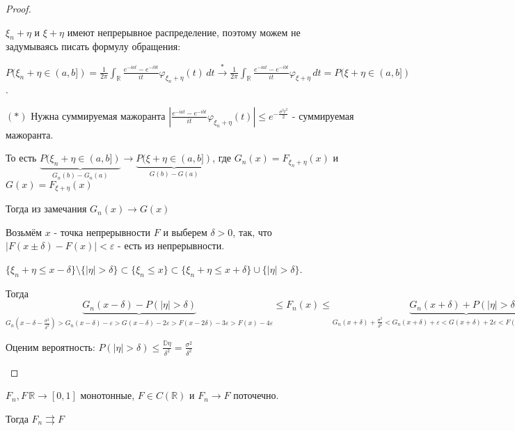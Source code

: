 \begin{proof}
\begin{enumerate}
{            $\xi_n + \eta$ и $\xi + \eta$ имеют непрерывное распределение, поэтому можем не задумываясь писать формулу обращения:

            $P(\xi_n + \eta \in (a, b]) = \frac{1}{2\pi} \int_{\mathbb{R}} \frac{e^{-iat} - e^{-ibt}}{it} \varphi_{\xi_n + \eta} (t) \, dt \overset{*}{\rightarrow} \frac{1}{2\pi} \int_{\mathbb{R}} \frac{e^{-iat} - e^{-ibt}}{it} \varphi_{\xi + \eta} \, dt = P(\xi + \eta \in (a, b])$.

            $(*)$ Нужна суммируемая мажоранта $\left | \frac{e^{-iat} - e^{-ibt}}{it} \varphi_{\xi_n + \eta} (t) \right | \leqslant e^{-\frac{\sigma^2t^2}{2}}$ - суммируемая мажоранта.

            То есть $\underbrace{P(\xi_n + \eta \in (a, b])}_{G_n (b) - G_n(a)} \rightarrow \underbrace{P(\xi + \eta \in (a, b])}_{G(b) - G(a)}$, где $G_n (x) = F_{\xi_n + \eta}(x)$ и $G(x) = F_{\xi + \eta} (x)$

            Тогда из замечания $G_n(x) \rightarrow G(x)$

            Возьмём $x$ - точка непрерывности $F$ и выберем $\delta > 0$, так, что $|F(x \pm \delta) - F(x)| < \varepsilon$ - есть из непрерывности.

            $ \{ \xi_n + \eta \leqslant x - \delta \} \setminus \{ |\eta| > \delta \} \subset  \{ \xi_n \leqslant x \} \subset \{ \xi_n + \eta \leqslant x + \delta \} \cup \{ |\eta| > \delta \}$.

            Тогда $\underbrace{G_{n} (x - \delta) - P(|\eta| > \delta)}_{G_n (x - \delta - \frac{\sigma^2}{\delta^2}) > G_n (x - \delta) - \varepsilon > G(x - \delta) - 2\varepsilon > F(x - 2\delta) - 3\varepsilon > F(x) - 4\varepsilon} \leqslant F_n (x) \leqslant
            \underbrace{G_{n} (x + \delta) + P(|\eta| > \delta)}_{G_n (x + \delta) + \frac{\sigma^2}{\delta^2} < G_n (x + \delta) + \varepsilon < G(x + \delta) + 2\varepsilon < F(x + 2\delta) + 3\varepsilon < F(x) + 4\varepsilon}$

            Оценим вероятность: $P(|\eta| > \delta) \leqslant \frac{\mathbb{D} \eta}{\delta^2} = \frac{\sigma^2}{\delta^2}$


        }
    \end{enumerate}
\end{proof}

\begin{theorem}
    $F_n, F \, \mathbb{R} \to [0, 1]$ монотонные, $F \in C(\mathbb{R})$ и 
    $F_n \to F$ поточечно.

    Тогда $F_n \rightrightarrows F$
\end{theorem}

